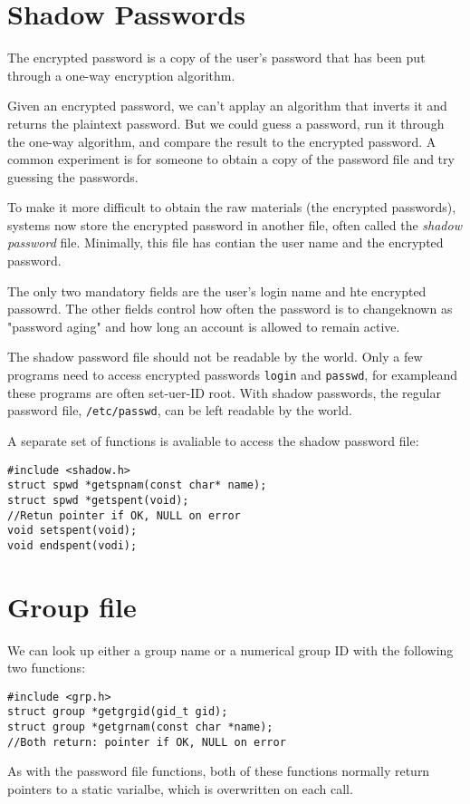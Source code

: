 \documentclass[a4paper,10pt]{book}
\begin{document}
\section{Shadow Passwords}
The encrypted password is a copy of the user's password that has been put
through a one-way encryption algorithm. 

Given an encrypted password, we can't applay an algorithm that inverts it and
returns the plaintext password. But we could guess a password, run it through
the one-way algorithm, and compare the result to the encrypted password. A
common experiment is for someone to obtain a copy of the password file and try
guessing the passwords.

To make it more difficult to obtain the raw materials (the encrypted passwords),
systems now store the encrypted password in another file, often called the
\emph{shadow password} file. Minimally, this file has contian the user name and
the encrypted password. 

The only two mandatory fields are the user's login name and hte encrypted
passowrd. The other fields control how often the password is to changeknown as
"password aging" and how long an account is allowed to remain active.

The shadow password file should not be readable by the world. Only a few
programs need to access encrypted passwords \verb|login| and \verb|passwd|, for
exampleand these programs are often set-uer-ID root. With shadow passwords, the
regular password file, \verb|/etc/passwd|, can be left readable by the world.

A separate set of functions is avaliable to access the shadow password file:
\begin{verbatim}
#include <shadow.h>
struct spwd *getspnam(const char* name);
struct spwd *getspent(void);
//Retun pointer if OK, NULL on error
void setspent(void);
void endspent(vodi);
\end{verbatim}

\section{Group file}
We can look up either a group name or a numerical group ID with the following
two functions:
\begin{verbatim}
#include <grp.h>
struct group *getgrgid(gid_t gid);
struct group *getgrnam(const char *name);
//Both return: pointer if OK, NULL on error
\end{verbatim}
As with the password file functions, both of these functions normally return
pointers to a static varialbe, which is overwritten on each call.
\end{document}
